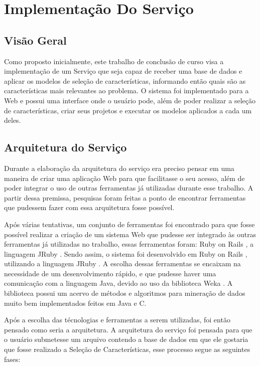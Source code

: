 \chapter[Implementação do Serviço]{Implementação Do Serviço}

\section{Visão Geral}

Como proposto inicialmente, este trabalho de conclusão de curso visa a implementação de um Serviço que seja capaz de receber uma base de dados e aplicar os modelos de seleção de características, informando então quais são as características mais relevantes ao problema. O sistema foi implementado para a Web e possui uma interface onde o usuário pode, além de poder realizar a seleção de características, criar seus projetos e executar os modelos aplicados a cada um deles.

\section{Arquitetura do Serviço}

Durante a elaboração da arquitetura do serviço era preciso pensar em uma maneira de criar uma aplicação Web para que facilitasse o seu acesso, além de poder integrar o uso de outras ferramentas já utilizadas durante esse trabalho. A partir dessa premissa, pesquisas foram feitas a ponto de encontrar ferramentas que pudessem fazer com essa arquitetura fosse possível. 

Após várias tentativas, um conjunto de ferramentas foi encontrado para que fosse possível realizar a criação de um sistema Web que pudesse ser integrado às outras ferramentas já utilizadas no trabalho, essas ferramentas foram: Ruby on Rails \cite{ror}, a linguagem JRuby \cite{jruby}. Sendo assim, o sistema foi desenvolvido em Ruby on Rails \cite{ror}, utilizando a linguagem JRuby \cite{jruby}. A escolha dessas ferramentas se encaixam na necessidade de um desenvolvimento rápido, e que pudesse haver uma comunicação com a linguagem Java, devido ao uso da biblioteca Weka \cite{weka_2005}. A biblioteca possui um acervo de métodos e algoritmos para mineração de dados muito bem implementados feitos em Java e C.

Após a escolha das técnologias e ferramentas a serem utilizadas, foi então pensado como seria a arquitetura. A arquitetura do serviço foi pensada para que o usuário submetesse um arquivo contendo a base de dados em que ele gostaria que fosse realizado a Seleção de Características, esse processo segue as seguintes fases:

